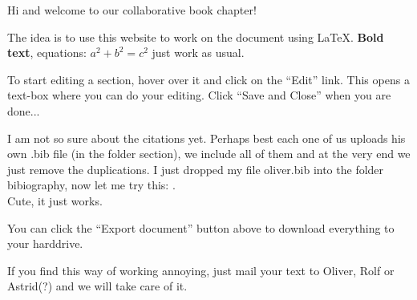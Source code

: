 Hi and welcome to our collaborative book chapter!  

The idea is to use this website to work on the document using \LaTeX.  \textbf{Bold text}, equations: $a^2+b^2=c^2$ just work as usual.  

To start editing a section, hover over it and click on the ``Edit'' link.  This opens a text-box where you can do your editing.  Click ``Save and Close'' when you are done...

I am not so sure about the citations yet.  Perhaps best each one of us uploads his own .bib file (in the folder section), we include all of them and at the very end we just remove the duplications.  
I just dropped my file oliver.bib into the folder bibiography, now let me try this: \cite{buehler2012}.\\
Cute, it just works.  

You can click the ``Export document'' button above to download everything to your harddrive.  

If you find this way of working annoying, just mail your text to Oliver, Rolf or Astrid(?) and we will take care of it.  